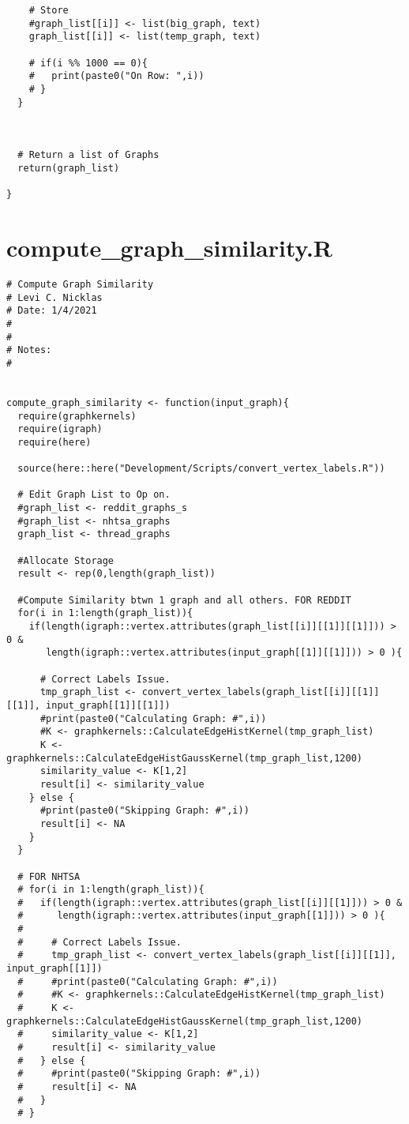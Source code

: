 \begin{appendices}
\begin{lstlisting}
    # Store
    #graph_list[[i]] <- list(big_graph, text)
    graph_list[[i]] <- list(temp_graph, text)
    
    # if(i %% 1000 == 0){
    #   print(paste0("On Row: ",i))
    # }
  }
  
  

  # Return a list of Graphs  
  return(graph_list)
  
}
\end{lstlisting}

\section{compute\_graph\_similarity.R}
\begin{lstlisting}
# Compute Graph Similarity
# Levi C. Nicklas
# Date: 1/4/2021
#
#
# Notes:  
#


compute_graph_similarity <- function(input_graph){
  require(graphkernels)
  require(igraph)
  require(here)
  
  source(here::here("Development/Scripts/convert_vertex_labels.R"))
  
  # Edit Graph List to Op on.
  #graph_list <- reddit_graphs_s
  #graph_list <- nhtsa_graphs
  graph_list <- thread_graphs
  
  #Allocate Storage
  result <- rep(0,length(graph_list))
  
  #Compute Similarity btwn 1 graph and all others. FOR REDDIT
  for(i in 1:length(graph_list)){
    if(length(igraph::vertex.attributes(graph_list[[i]][[1]][[1]])) > 0 &
       length(igraph::vertex.attributes(input_graph[[1]][[1]])) > 0 ){

      # Correct Labels Issue.
      tmp_graph_list <- convert_vertex_labels(graph_list[[i]][[1]][[1]], input_graph[[1]][[1]])
      #print(paste0("Calculating Graph: #",i))
      #K <- graphkernels::CalculateEdgeHistKernel(tmp_graph_list)
      K <- graphkernels::CalculateEdgeHistGaussKernel(tmp_graph_list,1200)
      similarity_value <- K[1,2]
      result[i] <- similarity_value
    } else {
      #print(paste0("Skipping Graph: #",i))
      result[i] <- NA
    }
  }
  
  # FOR NHTSA
  # for(i in 1:length(graph_list)){
  #   if(length(igraph::vertex.attributes(graph_list[[i]][[1]])) > 0 & 
  #      length(igraph::vertex.attributes(input_graph[[1]])) > 0 ){
  #     
  #     # Correct Labels Issue.
  #     tmp_graph_list <- convert_vertex_labels(graph_list[[i]][[1]], input_graph[[1]])
  #     #print(paste0("Calculating Graph: #",i))
  #     #K <- graphkernels::CalculateEdgeHistKernel(tmp_graph_list)
  #     K <- graphkernels::CalculateEdgeHistGaussKernel(tmp_graph_list,1200)
  #     similarity_value <- K[1,2]
  #     result[i] <- similarity_value
  #   } else {
  #     #print(paste0("Skipping Graph: #",i))
  #     result[i] <- NA
  #   }
  # }
  

\end{lstlisting}
\end{appendices}
